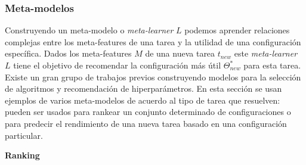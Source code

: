 \subsubsection{Meta-modelos}


Construyendo un meta-modelo o \textit{meta-learner} $L$ podemos aprender relaciones complejas entre los meta-features de una tarea y la utilidad de una configuración específica. Dados los meta-features $M$ de una nueva tarea $t_{new}$ este \textit{meta-learner} $L$ tiene el objetivo de recomendar la configuración más útil $\Theta_{new}^*$ para esta tarea. Existe un gran grupo de trabajos previos construyendo modelos para la selección de algoritmos y recomendación de hiperparámetros. En esta sección se usan ejemplos de varios meta-modelos de acuerdo al tipo de tarea que resuelven: pueden ser usados para rankear un conjunto determinado de configuraciones o para predecir el rendimiento de una nueva tarea basado en una configuración particular. %

\quad

\textbf{Ranking}


